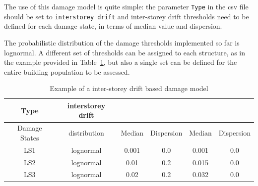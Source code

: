 The use of this damage model is quite simple: the parameter \verb=Type= in the csv file should be set to \verb=interstorey drift= and inter-storey drift thresholds need to be defined for each damage state, in terms of median value and dispersion.

The probabilistic distribution of the damage thresholds implemented so far is lognormal. A different set of thresholds can be assigned to each structure, as in the example provided in Table~\ref{table:dm_ISD}, but also a single set can be defined for the entire building population to be assessed.

\begin {table}[htb]
\caption{Example of a inter-storey drift based damage model}
\label{table:dm_ISD}
\begin{center}
  \begin{tabular}{ | c | c | c | c | c | c |}
  \hline
    Type & interstorey drift &  &  & & \\ \hline
    Damage States & distribution & Median & Dispersion & Median & Dispersion \\ \hline
    LS1 & lognormal & 0.001 & 0.0 & 0.001 & 0.0 \\ \hline
    LS2 & lognormal & 0.01  & 0.2 & 0.015 & 0.0 \\ \hline
    LS3 & lognormal & 0.02  & 0.2 & 0.032 & 0.0 \\ \hline
  \end{tabular}
\end{center}
\end{table}

\label{subsubsec:strain-dmg}